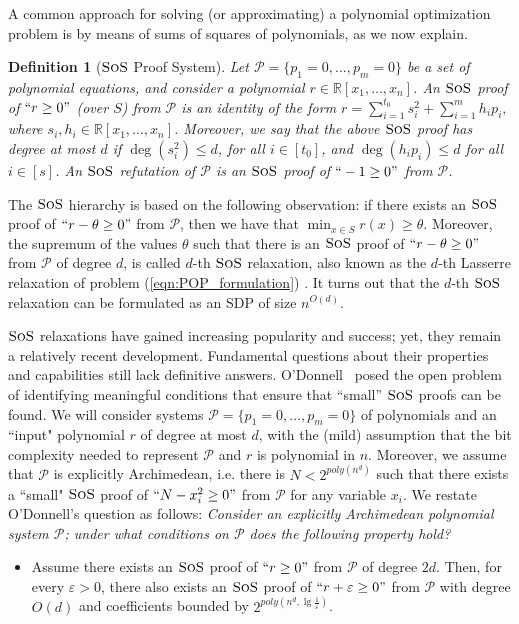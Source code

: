\documentclass[11pt]{article}
\newcommand{\sos}{\text{\sc{SoS}}}
\newcommand{\1}{\textbf{1}}
\newtheorem{definition}[theorem]{Definition}
\begin{document}
A common approach for solving (or approximating) a polynomial optimization problem is by means of sums of squares of polynomials, as we now explain.
\begin{definition}[$\sos$ Proof System]\label{def:SOS_proof}
    Let $\mathcal{P} = \{p_1=0,\ldots,p_m=0\}$ be a set of polynomial equations, and consider a polynomial $r\in \mathbb{R}[x_1, \dots, x_n]$. An $\sos$ proof of $``r\geq 0"$ (over $S$) from $\mathcal{P}$ is an identity of the form $r = \sum_{i=1}^{t_0} s_i^2 + \sum_{i=1}^m h_i p_i,$
where $s_i, h_i\in \mathbb{R}[x_1, \ldots, x_n]$. Moreover, we say that the above $\sos$ proof has \emph{degree} at most $d$ if $\deg(s_i^2) \leq d$, for all $i \in [t_0]$, and $\deg(h_i p _i) \leq d$ for all $i \in [s]$. An \emph{$\sos$ refutation of $\mathcal{P}$} is an $\sos$ proof of $``-1 \geq 0"$ from $\mathcal{P}$.
\end{definition}

The $\sos$ hierarchy is based on the following observation: if there exists an $\sos$ proof of $`` r - \theta \geq 0"$ from $\mathcal{P}$, then we have that $\min_{x \in S} r(x) \geq \theta$. Moreover, the supremum of the values $\theta$ such that there is an $\sos$ proof of $``r - \theta \geq 0"$ from $\mathcal{P}$ of degree $d$, is called $d$-th $\sos$ relaxation, also known as the $d$-th Lasserre relaxation of problem (\ref{eqn:POP_formulation}) \cite{Lasserre2001,Parrilo03}. It turns out that the $d$-th  $\sos$ relaxation can be formulated as an SDP of size $n^{O(d)}$.

\(\sos\) relaxations have gained increasing popularity and success; yet, they remain a relatively recent development. Fundamental questions about their properties and capabilities still lack definitive answers. O'Donnell~\cite{odonnell2017} posed the open problem of identifying meaningful conditions that ensure that “small” \(\sos\) proofs can be found. We will consider systems $\mathcal{P} = \{p_1 = 0,\ldots,p_m = 0\}$ of polynomials and an ``input" polynomial $r$ of degree at most $d$, with the (mild) assumption that the bit complexity needed to represent $\mathcal{P}$ and $r$ is polynomial in $n$. Moreover, we assume that $\mathcal{P}$ is explicitly Archimedean, i.e. there is $N<2^{poly(n^d)}$ such that there exists a ``small" $\sos$ proof of $``N - x_i^2 \geq 0"$ from $\mathcal{P}$ for any variable $x_i$.
We restate O'Donnell's question as follows: \emph{Consider an explicitly Archimedean polynomial system \(\mathcal{P}\); under what conditions on $\mathcal{P}$ does the following property hold?}
\begin{itemize}[label=$(\rm{P})$]
    \item Assume there exists an $\sos$ proof of $``r \geq 0"$ from $\mathcal{P}$ of degree $2d$. Then, for every $\varepsilon>0$, there also exists an $\sos$ proof of $``r +\varepsilon \geq 0"$ from $\mathcal{P}$ with degree $O(d)$ and coefficients bounded by $2^{poly(n^d,\lg \frac{1}{\varepsilon})}$.
\end{itemize}
\end{document}
